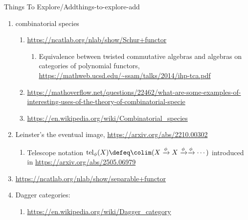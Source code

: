 \begin{remark}{Things To Explore/Add}{things-to-explore-add}
\begin{enumerate}
\begin{enumerate}
                \item \url{https://arxiv.org/abs/2104.11399}
                \item \url{https://terrytao.wordpress.com/2017/04/13/counting-objects-up-to-isomorphism-groupoid-cardinality/}
                \item \url{https://arxiv.org/abs/0809.2130}
                \item \url{https://qchu.wordpress.com/2012/11/08/groupoid-cardinality/}
                \item \url{https://mathoverflow.net/questions/363292/what-is-the-groupoid-cardinality-of-the-category-of-vector-spaces-over-a-finite}
            \end{enumerate}
        \item combinatorial species
            \begin{enumerate}
                \item \url{https://ncatlab.org/nlab/show/Schur+functor}
                    \begin{enumerate}
                        \item Equivalence between twisted commutative algebras and algebras on categories of polynomial functors, \url{https://mathweb.ucsd.edu/~ssam/talks/2014/ihp-tca.pdf}
                    \end{enumerate}
                \item \url{https://mathoverflow.net/questions/22462/what-are-some-examples-of-interesting-uses-of-the-theory-of-combinatorial-specie}
                \item \url{https://en.wikipedia.org/wiki/Combinatorial_species}
            \end{enumerate}
        \item Leinster's the eventual image, \url{https://arxiv.org/abs/2210.00302}
            \begin{enumerate}
                \item Telescope notation $\mathrm{tel}_{\phi}(X)\defeq\colim(X\xrightarrow{\phi}X\xrightarrow{\phi}\xrightarrow{\phi}\cdots)$ introduced in \url{https://arxiv.org/abs/2505.06979}
            \end{enumerate}
        \item \url{https://ncatlab.org/nlab/show/separable+functor}
        \item Dagger categories:
            \begin{enumerate}
                \item \url{https://en.wikipedia.org/wiki/Dagger_category}

\end{enumerate}
\end{enumerate}
\end{remark}
